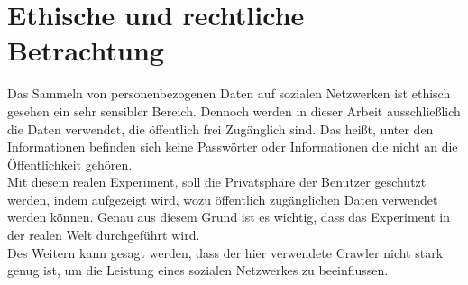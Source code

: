 \chapter{Ethische und rechtliche Betrachtung}  %
\label{cha:EthischeUndRechtlicheBetrachtung} %
Das Sammeln von personenbezogenen Daten auf sozialen Netzwerken ist ethisch gesehen ein sehr sensibler Bereich. Dennoch werden in dieser Arbeit ausschließlich die Daten verwendet, die öffentlich frei Zugänglich sind. Das heißt, unter den Informationen befinden sich keine Passwörter oder Informationen die nicht an die Öffentlichkeit gehören.\\
Mit diesem realen Experiment, soll die Privatsphäre der Benutzer geschützt werden, indem aufgezeigt wird, wozu öffentlich zugänglichen Daten verwendet werden können. Genau aus diesem Grund ist es wichtig, dass das Experiment in der realen Welt durchgeführt wird.\\
Des Weitern kann gesagt werden, dass der hier verwendete Crawler nicht stark genug ist, um die Leistung eines sozialen Netzwerkes zu beeinflussen.
